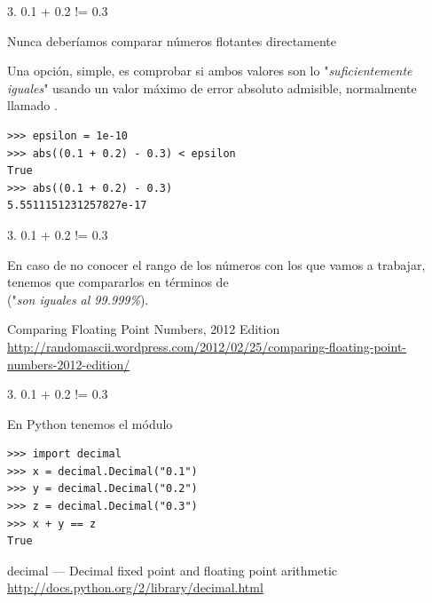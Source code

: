 \documentclass[14pt]{beamer}
\begin{document}
\begin{frame}[fragile]{3. 0.1 + 0.2 != 0.3}
  \begin{alertblock}{}
    \centering \small Nunca deberíamos comparar números flotantes
    directamente
  \end{alertblock}

  \small
  \begin{center}
    Una opción, simple, es comprobar si ambos valores son lo
    "\emph{suficientemente iguales}" usando un valor máximo de error
    absoluto admisible, normalmente llamado .
   \end{center}

  \begin{exampleblock}{}
    \begin{lstlisting}
>>> epsilon = 1e-10
>>> abs((0.1 + 0.2) - 0.3) < epsilon
True
>>> abs((0.1 + 0.2) - 0.3)
5.5511151231257827e-17
    \end{lstlisting}
  \end{exampleblock}
\end{frame}

\begin{frame}{3. 0.1 + 0.2 != 0.3}
  \large
  \begin{center}
    En caso de no conocer el rango de los números con los que vamos a
    trabajar, tenemos que compararlos en términos de  \\ ("\emph{son iguales al 99.999\%}).
  \end{center}

  \small
  \begin{block}{Comparing Floating Point Numbers, 2012 Edition}
    \centering \url{http://randomascii.wordpress.com/2012/02/25/comparing-floating-point-numbers-2012-edition/}
  \end{block}
\end{frame}

\begin{frame}[fragile]{3. 0.1 + 0.2 != 0.3}
  \begin{block}{}
    \centering En Python tenemos el módulo 
  \end{block}

  \begin{exampleblock}{}
    \begin{lstlisting}
>>> import decimal
>>> x = decimal.Decimal("0.1")
>>> y = decimal.Decimal("0.2")
>>> z = decimal.Decimal("0.3")
>>> x + y == z
True
    \end{lstlisting}
  \end{exampleblock}

  \small
  \begin{block}{decimal --- Decimal fixed point and floating point arithmetic}
    \centering \url{http://docs.python.org/2/library/decimal.html}
  \end{block}
\end{frame}
\end{document}
